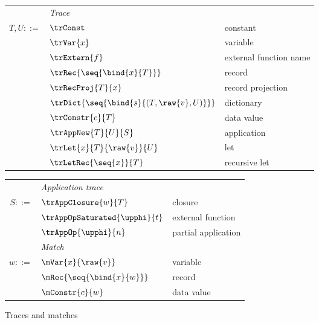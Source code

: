 \begin{figure}
\begin{minipage}[t]{0.52\textwidth}
\begin{tabularx}{\textwidth}{rL{2.8cm}L{3.4cm}}
   &\textit{Trace}&
   \\
   $T, U ::=$
   &
   $\trConst$
   &
   constant
   \\
   &
   $\trVar{x}$
   &
   variable
   \\
   &
   $\trExtern{f}$
   &
   external function name
   \\
   &
   $\trRec{\seq{\bind{x}{T}}}$
   &
   record
   \\
   &
   $\trRecProj{T}{x}$
   &
   record projection
   \\
   &
   $\trDict{\seq{\bind{s}{(T, \raw{v}, U)}}}$
   &
   dictionary
   \\
   &
   $\trConstr{c}{T}$
   &
   data value
   \\
   &
   $\trAppNew{T}{U}{S}$
   &
   application
   \\
   &
   $\trLet{x}{T}{\raw{v}}{U}$
   &
   let
   \\
   &
   $\trLetRec{\seq{x}}{T}$
   &
   recursive let
\end{tabularx}
\end{minipage}%
\hspace{6mm}
\begin{minipage}[t]{0.42\textwidth}
\begin{tabularx}{\textwidth}{rL{2.5cm}L{2.9cm}}
   &\textit{Application trace}&
   \\
   $S ::=$
   &
   $\trAppClosure{w}{T}$
   &
   closure
   \\
   &
   $\trAppOpSaturated{\upphi}{t}$
   &
   external function
   \\
   &
   $\trAppOp{\upphi}{n}$
   &
   partial application
   \\[2mm]
   &\textit{Match}&
   \\
   $w ::=$
   &
   $\mVar{x}{\raw{v}}$
   &
   variable
   \\
   &
   $\mRec{\seq{\bind{x}{w}}}$
   &
   record
   \\
   &
   $\mConstr{c}{w}$
   &
   data value
   \\[14mm]
\end{tabularx}
\end{minipage}
\caption{Traces and matches}
\end{figure}

